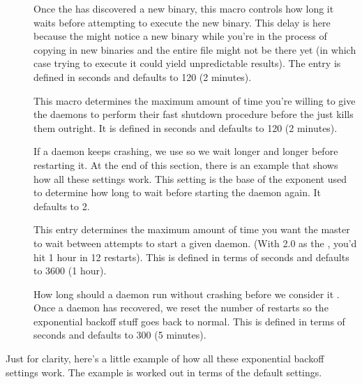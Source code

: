\begin{description}
\item[]
  \label{param:MasterNewBinaryDelay} Once the  has
  discovered a new binary, this macro controls how long it waits
  before attempting to execute the new binary.  This delay is here
  because the  might notice a new binary while you're
  in the process of copying in new binaries and the entire file might
  not be there yet (in which case trying to execute it could yield
  unpredictable results).  The entry is defined in seconds and
  defaults to 120 (2 minutes).

\item[]
  \label{param:ShutdownFastTimeout} This macro determines the maximum
  amount of time you're willing to give the daemons to perform their
  fast shutdown procedure before the  just kills them
  outright.  It is defined in seconds and defaults to 120 (2 minutes).

\item[]
  \label{param:MasterBackoffFactor} If a daemon keeps crashing, we
  use  so we wait longer and longer before
  restarting it.  At the end of this section, there is an example that
  shows how all these settings work.  This setting is the base of the
  exponent used to determine how long to wait before starting the
  daemon again.  It defaults to 2.

\item[]
  \label{param:MasterBackoffCeiling} This entry determines the maximum
  amount of time you want the master to wait between attempts to start
  a given daemon.  (With 2.0 as the ,
  you'd hit 1 hour in 12 restarts).  This is defined in terms of
  seconds and defaults to 3600 (1 hour).

\item[]
  \label{param:MasterRecoverFactor}  How long should a daemon run
  without crashing before we consider it .  Once a
  daemon has recovered, we reset the number of restarts so the
  exponential backoff stuff goes back to normal.  This is defined in
  terms of seconds and defaults to 300 (5 minutes).

\end{description}

Just for clarity, here's a little example of how all these exponential
backoff settings work.  The example is worked out in terms of the
default settings.

